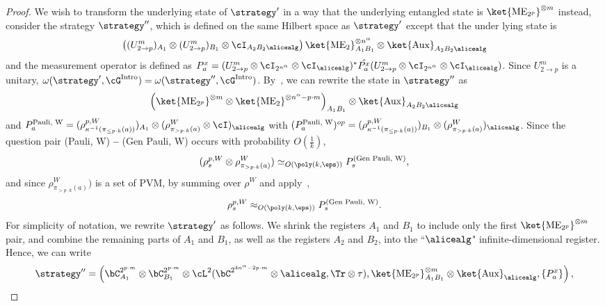 \begin{proof}
	We wish to transform the underlying state of $\strategy'$ in a way that the underlying entangled state is $\ket{\text{ME}_{2^p}}^{\otimes m}$ instead, consider the strategy $\strategy''$, which is defined on the same Hilbert space as $\strategy'$ except that the under lying state is 
	\begin{equation*}
	 \left((U_{2 \rightarrow p}^m)_{A_1} \otimes (U_{2 \rightarrow p}^m)_{B_1} \otimes \cI_{A_2 B_2 \alicealg} \right)\ket{\text{ME}_2}^{\otimes n^{\alpha}}_{A_1 B_1} \otimes \ket{\text{Aux}}_{A_2 B_2 \alicealg}
	\end{equation*}
	and the measurement operator is defined as $P_a^x = (U_{2 \rightarrow p}^m \otimes \cI_{2^{n^{\alpha}}} \otimes \cI_{\alicealg})^* \hat{P_a^x} (U_{2 \rightarrow p}^m \otimes \cI_{2^{n^{\alpha}}} \otimes \cI_{\alicealg})$. Since $U_{2 \rightarrow p}^m$ is a unitary, $\omega(\strategy', \cG^{\text{Intro}}) = \omega(\strategy'', \cG^{\text{Intro}})$. By~, we can rewrite the state in $\strategy''$ as 
	\begin{equation*}
		\left(\ket{\text{ME}_{2^p}}^{\otimes m} \otimes \ket{\text{ME}_{2}}^{\otimes n^{\alpha} - p \cdot m} \right)_{A_1 B_1}  \otimes \ket{\text{Aux}}_{A_2 B_2 \alicealg}
	\end{equation*}
	and $P^{\text{\text{Pauli}, W}}_{a}  = (\rho^{p, W}_{\kappa^{-1}(\pi_{\leq p \cdot k}(a))})_{A_1}\otimes (\rho^{W}_{\pi_{> p \cdot k}(a)} \otimes \cI)_{\alicealg}$ with $(P^{\text{Pauli, W}}_{a})^{op} = (\rho^{p, W}_{\kappa^{-1}(\pi_{\leq p \cdot k}(a))})_{B_1}\otimes (\rho^{W}_{\pi_{> p \cdot k}(a)} )_{\alicealg}$. Since the question pair (Pauli, W) \textbf{--} (Gen Pauli, W) occurs with probability $O(\frac{1}{k})$, 
	\begin{equation*}
		(\rho^{p, W}_{s}\otimes \rho^{W}_{\pi_{> p \cdot k}(a)})  \simeq_{O(\poly(k, \eps))} P^{(\text{Gen Pauli, W})}_s, 
	\end{equation*}
	and since $\rho^{W}_{\pi_{> p \cdot k}(a)})$ is a set of PVM, by summing over $\rho^{W}$ and apply~, 
	\begin{equation*}
		\rho^{p, W}_{s}  \approx_{O(\poly(k, \eps))} P^{(\text{Gen Pauli, W})}_s. 
	\end{equation*}
	For simplicity of notation, we rewrite $\strategy'$ as follows. We shrink the registers $A_1$ and $B_1$ to include only the first $\ket{\text{ME}_{2^p}}^{\otimes m}$ pair, and combine the remaining parts of $A_1$ and $B_1$, as well as the registers $A_2$ and $B_2$, into the ``$\alicealg$" infinite-dimensional register. Hence, we can write
	\begin{equation*}
		\strategy'' =  \left(\bC^{2^{p\cdot m}}_{A_1} \otimes \bC^{2^{p \cdot m}}_{B_1} \otimes  \cL^2(\bC^{2^{4n^{\alpha} - 2p \cdot m}} \otimes  \alicealg, \Tr\otimes \tau), \ket{\text{ME}_{2^p}}^{\otimes m}_{A_1 B_1} \otimes \ket{\text{Aux}}_{\alicealg}, \{ P_{a}^x \} \right),
	\end{equation*}
	

\end{proof}
